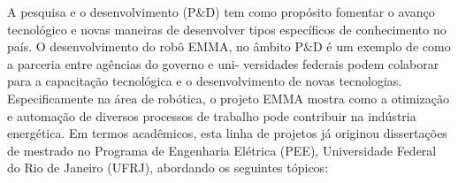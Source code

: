 A pesquisa e o desenvolvimento (P\&D) tem como propósito fomentar o avanço
tecnológico e novas maneiras de desenvolver tipos específicos de conhecimento
no país. O desenvolvimento do robô EMMA, no âmbito P\&D é um exemplo de como a
parceria entre agências do governo e uni- versidades federais podem colaborar
para a capacitação tecnológica e o desenvolvimento de novas tecnologias.
Especificamente na área de robótica, o projeto EMMA mostra como a otimização e
automação de diversos processos de trabalho pode contribuir na indústria
energética. Em termos acadêmicos, esta linha de projetos já originou %
dissertações de mestrado no Programa de Engenharia Elétrica (PEE), Universidade
Federal do Rio de Janeiro (UFRJ), abordando os seguintes tópicos:





